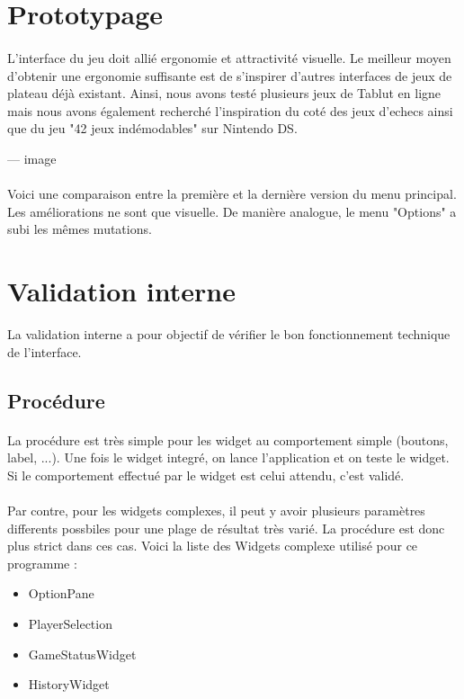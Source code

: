 \documentclass[11pt]{article} %
\begin{document}
\section{Prototypage}
\paragraph{}
L'interface du jeu doit allié ergonomie et attractivité visuelle. Le meilleur moyen d'obtenir une ergonomie suffisante est de s'inspirer d'autres interfaces de jeux de plateau déjà existant. Ainsi, nous avons testé plusieurs jeux de Tablut en ligne mais nous avons également recherché l'inspiration du coté des jeux d'echecs ainsi que du jeu "42 jeux indémodables" sur Nintendo DS.

--- image

\paragraph{}
Voici une comparaison entre la première et la dernière version du menu principal. Les améliorations ne sont que visuelle. De manière analogue, le menu "Options" a subi les mêmes mutations. 

\paragraph{}


\section{Validation interne}

La validation interne a pour objectif de vérifier le bon fonctionnement technique de l'interface.

\subsection{Procédure}
\paragraph{}
La procédure est très simple pour les widget au comportement simple (boutons, label, ...). Une fois le widget integré, on lance l'application et on teste le widget. Si le comportement effectué par le widget est celui attendu, c'est validé.
\paragraph{}
Par contre, pour les widgets complexes, il peut y avoir plusieurs paramètres differents possbiles pour une plage de résultat très varié. La procédure est donc plus strict dans ces cas. Voici la liste des Widgets complexe utilisé pour ce programme :
\begin{itemize}
\item OptionPane
\item PlayerSelection
\item GameStatusWidget
\item HistoryWidget
\end{itemize}
\end{document}
